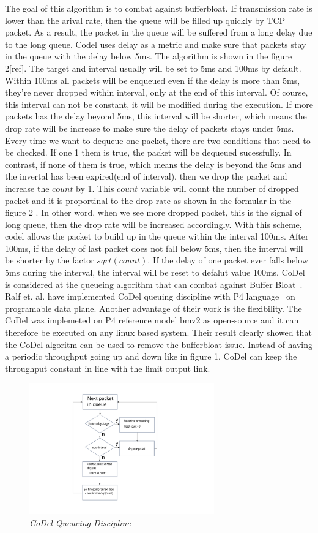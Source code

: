 The goal of this algorithm is to combat against bufferbloat. If transmission rate is lower than the arival rate, then the queue will be filled up quickly by TCP packet. As a result, the packet in the queue will be suffered from a long delay due to the long queue. Codel uses delay as a metric and make sure that packets stay in the queue with the delay below 5ms. The algorithm is shown in the figure 2[ref]. The target and interval usually will be set to 5ms and 100ms by default. Within 100ms all packets will be enqueued even if the delay is more than 5ms, they're never dropped within interval, only at the end of this interval. Of course, this interval can not be constant, it will be modified during the execution. If more packets has the delay beyond 5ms, this interval will be shorter, which means the drop rate will be increase to make sure the delay of packets stays under 5ms. Every time we want to dequeue one packet, there are two conditions that need to be checked. If one 1 them is true, the packet will be dequeued sucessfully. In contrast, if none of them is true, which means the delay is beyond the 5ms and the invertal has been expired(end of interval), then we drop the packet and increase the $count$ by 1. This $count$ variable will count the number of dropped packet and it is proportinal to the drop rate as shown in the formular in the figure 2 . In other word, when we see more dropped packet, this is the signal of long queue, then the drop rate will be increased accordingly. With this scheme, codel allows the packet to build up in the queue within the interval 100ms. After 100ms, if the delay of last packet does not fall below 5ms, then the interval will be shorter by the factor $sqrt(count)$. If the delay of one packet ever falls below 5ms during the interval, the interval will be reset to defalut value 100ms. CoDel~\cite{nichols2013controlled} is considered at the queueing algorithm that can combat against Buffer Bloat~\cite{gettys2012bufferbloat}. Ralf et. al. have implemented CoDel queuing discipline with P4 language~\cite{bosshart2014p4} on programable data plane. Another advantage of their work is the flexibility. The CoDel was implemeted on P4 reference model bmv2 as open-source and it can therefore be executed on any linux based system. Their result clearly showed that the CoDel algoritm can be used to remove the bufferbloat issue. Instead of having a periodic throughput going up and down like in figure 1, CoDel can keep the throughput constant in line with the limit output link.  
\begin{figure}[h]
\centering
\includegraphics*[width=8cm]{codel}
\caption{\em CoDel Queueing Discipline}
\label{fig:tcp}
\end{figure}

